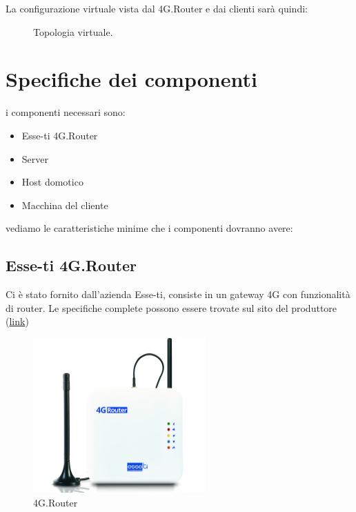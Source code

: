 La configurazione virtuale vista dal 4G.Router e dai clienti sar\`a quindi:

\begin{figure}[ht]
	\centering
	
	\caption{Topologia virtuale. \cite{icons}}

	\label{fig:schema_architettura_virtuale}

\end{figure}

\section{Specifiche dei componenti}

i componenti necessari sono:

\begin{itemize}
	\item Esse-ti 4G.Router
	\item Server
	\item Host domotico
	\item Macchina del cliente
\end{itemize}

vediamo le caratteristiche minime che i componenti dovranno avere:

\subsection{Esse-ti 4G.Router}

Ci \`e stato fornito dall'azienda Esse-ti, consiste in un gateway 4G con funzionalità di router. Le specifiche complete possono essere trovate sul sito del produttore (\href{https://www.esse-ti.it/4g-router}{link})


\begin{figure}[ht]
	\centering
	\includegraphics[width=250px]{immagini/4grouter.jpg}
	\caption{4G.Router}

	\label{fig:esse-ti-router-4g}

\end{figure}

